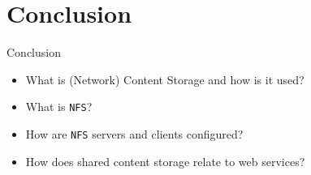 \documentclass[xcolor=table]{beamer}
\begin{document}
\section*{Conclusion}
\begin{frame}{Conclusion}
  \begin{itemize}
    \item What is (Network) Content Storage and how is it used?
    \item What is \texttt{NFS}?
    \item How are \texttt{NFS} servers and clients configured?
    \item How does shared content storage relate to web services?
  \end{itemize}
\end{frame}
\end{document}
